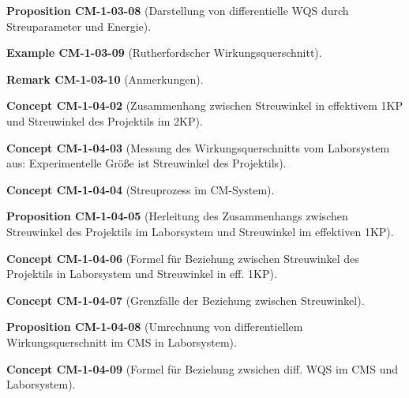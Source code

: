 \documentclass[10pt, letterpaper]{article}
\newcommand{\CustomHeading}[3]{%
  \par\medskip\noindent%
  \textbf{#1 #2} \textnormal{(#3)}.\enskip%
}
\newenvironment{PROP}[2]{\CustomHeading{Proposition}{#1}{#2}}{}
\newenvironment{REM}[2]{\CustomHeading{Remark}{#1}{#2}}{}
\newenvironment{EXA}[2]{\CustomHeading{Example}{#1}{#2}}{}
\newenvironment{CONC}[2]{\CustomHeading{Concept}{#1}{#2}}{}
\begin{document}
\begin{PROP}{CM-1-03-08}{Darstellung von differentielle WQS durch Streuparameter und Energie}
\end{PROP}

\begin{EXA}{CM-1-03-09}{Rutherfordscher Wirkungsquerschnitt}
\end{EXA}

\begin{REM}{CM-1-03-10}{Anmerkungen}
\end{REM}

\begin{CONC}{CM-1-04-02}{Zusammenhang zwischen Streuwinkel in effektivem 1KP und Streuwinkel des Projektils im 2KP}
\end{CONC}

\begin{CONC}{CM-1-04-03}{Messung des Wirkungsquerschnitts vom Laborsystem aus: Experimentelle Größe ist Streuwinkel des Projektils}
\end{CONC}

\begin{CONC}{CM-1-04-04}{Streuprozess im CM-System}
\end{CONC}

\begin{PROP}{CM-1-04-05}{Herleitung des Zusammenhangs zwischen Streuwinkel des Projektils im Laborsystem und Streuwinkel im effektiven 1KP}
\end{PROP}

\begin{CONC}{CM-1-04-06}{Formel für Beziehung zwischen Streuwinkel des Projektils in Laborsystem und Streuwinkel in eff. 1KP}
\end{CONC}

\begin{CONC}{CM-1-04-07}{Grenzfälle der Beziehung zwischen Streuwinkel}
\end{CONC}

\begin{PROP}{CM-1-04-08}{Umrechnung von differentiellem Wirkungsquerschnitt im CMS in Laborsystem}
\end{PROP}

\begin{CONC}{CM-1-04-09}{Formel für Beziehung zwsichen diff. WQS im CMS und Laborsystem}
\end{CONC}
\end{document}
